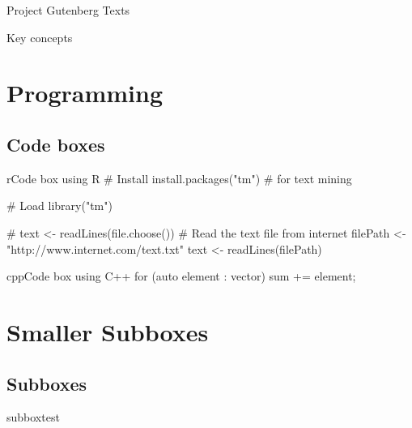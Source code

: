 \documentclass[10pt,a4paper]{article}
\begin{document}
\begin{multicols}{3}
\begin{textbox}{Project Gutenberg Texts}
	\end{textbox}
	
	\begin{textbox}{Key concepts}
		
		
		
		
	\end{textbox}
	
	
	\section{Programming}
	
	\subsection{Code boxes}
	
	
	\begin{codebox}{r}{Code box using R}
		# Install
		install.packages("tm")  # for text mining
		
		# Load
		library("tm")
		
		# text <- readLines(file.choose())
		# Read the text file from internet
		filePath <- "http://www.internet.com/text.txt"
		text <- readLines(filePath)
		
	\end{codebox}
	
	
	\begin{codebox}{cpp}{Code box using C++}
		for (auto element : vector) 
		{
			sum += element;
		}
	\end{codebox}
	
	\newpage
	\section{Smaller Subboxes}
	\subsection{Subboxes}
	\begin{multibox}{2} %
		\begin{subbox}{subbox}{test}
			\tiny
			

\end{subbox}
\end{multibox}
\end{multicols}
\end{document}
